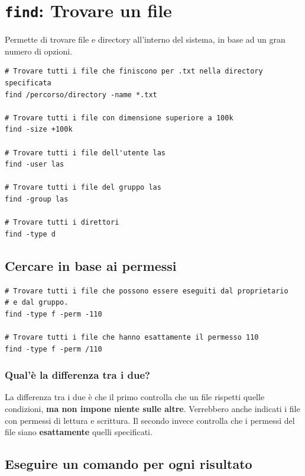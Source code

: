 \documentclass[a4paper]{report}
\newenvironment{code}{\begin{tcolorbox}[size=small]}{\end{tcolorbox}}
\begin{document}
\section{\texttt{find}: Trovare un file}

Permette di trovare file e directory all'interno del sistema, in base ad un gran numero di opzioni.

\begin{code}
\begin{lstlisting}
# Trovare tutti i file che finiscono per .txt nella directory specificata 
find /percorso/directory -name *.txt

# Trovare tutti i file con dimensione superiore a 100k
find -size +100k

# Trovare tutti i file dell'utente las
find -user las

# Trovare tutti i file del gruppo las
find -group las

# Trovare tutti i direttori
find -type d
\end{lstlisting}
\end{code}

\subsection*{Cercare in base ai permessi}

\begin{code}
\begin{lstlisting}
# Trovare tutti i file che possono essere eseguiti dal proprietario
# e dal gruppo.
find -type f -perm -110

# Trovare tutti i file che hanno esattamente il permesso 110
find -type f -perm /110
\end{lstlisting}
\end{code}

\subsubsection*{Qual'è la differenza tra i due?} 

La differenza tra i due è che il primo controlla che un file rispetti quelle condizioni, \textbf{ma non impone niente sulle altre}. Verrebbero anche indicati i file con permessi di lettura e scrittura.
Il secondo invece controlla che i permessi del file siano \textbf{esattamente} quelli specificati.

\subsection*{Eseguire un comando per ogni risultato}
\end{document}
